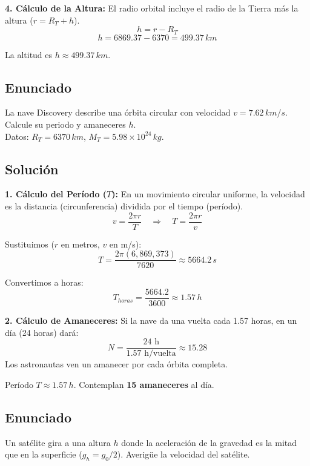 \documentclass[12pt, a4paper]{article}
\begin{document}
\textbf{4. Cálculo de la Altura:}
El radio orbital incluye el radio de la Tierra más la altura ($r = R_T + h$).
$$ h = r - R_T $$
$$ h = 6869.37 - 6370 = 499.37 \, \si{km} $$

\begin{tcolorbox}[colback=green!5!white,title=Respuesta]
La altitud es $h \approx 499.37 \, \si{km}$.
\end{tcolorbox}

\newpage

\subsection*{Enunciado}
La nave Discovery describe una órbita circular con velocidad $v = 7.62 \, \si{km/s}$. Calcule su periodo y amaneceres $h$.
\\
Datos: $R_T = 6370 \, \si{km}$, $M_T = 5.98 \times 10^{24} \, \si{kg}$.

\subsection*{Solución}

\textbf{1. Cálculo del Período ($T$):}
En un movimiento circular uniforme, la velocidad es la distancia (circunferencia) dividida por el tiempo (período).
$$ v = \frac{2\pi r}{T} \quad \Rightarrow \quad T = \frac{2\pi r}{v} $$

Sustituimos ($r$ en metros, $v$ en m/s):
$$ T = \frac{2\pi (6,869,373)}{7620} \approx 5664.2 \, \si{s} $$

Convertimos a horas:
$$ T_{horas} = \frac{5664.2}{3600} \approx 1.57 \, \si{h} $$

\textbf{2. Cálculo de Amaneceres:}
Si la nave da una vuelta cada 1.57 horas, en un día (24 horas) dará:
$$ N = \frac{24 \text{ h}}{1.57 \text{ h/vuelta}} \approx 15.28 $$
Los astronautas ven un amanecer por cada órbita completa.

\begin{tcolorbox}[colback=green!5!white,title=Respuesta]
Período $T \approx 1.57 \, \si{h}$. Contemplan \textbf{15 amaneceres} al día.
\end{tcolorbox}

\newpage

\subsection*{Enunciado}
Un satélite gira a una altura $h$ donde la aceleración de la gravedad es la mitad que en la superficie ($g_h = g_0 / 2$). Averigüe la velocidad del satélite.
\end{document}
